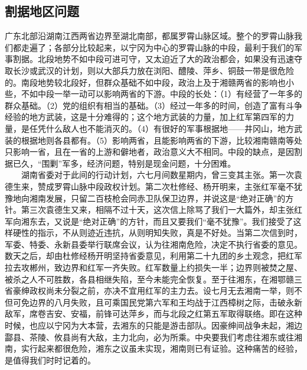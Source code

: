 \documentclass[cn,11pt,chinese]{elegantbook}
\def\myformat#1{\hfil\hfil #1}
\begin{document}
\subsection*{\myformat{割据地区问题}}
广东北部沿湖南江西两省边界至湖北南部，都属罗霄山脉区域。整个的罗霄山脉我们都走遍了；各部分比较起来，以宁冈为中心的罗霄山脉的中段，最利于我们的军事割据。北段地势不如中段可进可守，又太迫近了大的政治都会，如果没有迅速夺取长沙或武汉的计划，则以大部兵力放在浏阳、醴陵、萍乡、铜鼓一带是很危险的。南段地势较北段好，但群众基础不如中段，政治上及于湘赣两省的影响也小些，不如中段一举一动可以影响两省的下游。中段的长处：（1）有经营了一年多的群众基础。（2）党的组织有相当的基础。（3）经过一年多的时间，创造了富有斗争经验的地方武装，这是十分难得的；这个地方武装的力量，加上红军第四军的力量，是任凭什么敌人也不能消灭的。（4）有很好的军事根据地——井冈山，地方武装的根据地则各县都有。（5）影响两省，且能影响两省的下游，比较湘南赣南等处只影响一省，且在一省的上游和僻地者，政治意义大不相同。中段的缺点，是因割据已久，“围剿”军多，经济问题，特别是现金问题，十分困难。\\
　　湖南省委对于此间的行动计划，六七月间数星期内，曾三变其主张。第一次袁德生来，赞成罗霄山脉中段政权计划。第二次杜修经、杨开明来，主张红军毫不犹豫地向湘南发展，只留二百枝枪会同赤卫队保卫边界，并说这是“绝对正确”的方针。第三次袁德生又来，相隔不过十天，这次信上除骂了我们一大篇外，却主张红军向湘东去，又说是“绝对正确”的方针，而且又要我们“毫不犹豫”。我们接受了这样硬性的指示，不从则迹近违抗，从则明知失败，真是不好处。当第二次信到时，军委、特委、永新县委举行联席会议，认为往湘南危险，决定不执行省委的意见。数天之后，却由杜修经杨开明坚持省委意见，利用第二十九团的乡土观念，把红军拉去攻郴州，致边界和红军一齐失败。红军数量上约损失一半；边界则被焚之屋、被杀之人不可胜数，各县相继失陷，至今未能完全恢复。至于往湘东，在湘鄂赣三省豪绅政权尚未分裂之前，亦决不宜用红军的主力去。设七月无去湘南一举，则不但可免边界的八月失败，且可乘国民党第六军和王均战于江西樟树之际，击破永新敌军，席卷吉安、安福，前锋可达萍乡，而与北段之红第五军取得联络。即在这种时候，也应以宁冈为大本营，去湘东的只能是游击部队。因豪绅间战争未起，湘边酃县、茶陵、攸县尚有大敌，主力北向，必为所乘。中央要我们考虑往湘东或往湘南，实行起来都很危险，湘东之议虽未实现，湘南则已有证验。这种痛苦的经验，是值得我们时时记着的。\\
\end{document}
